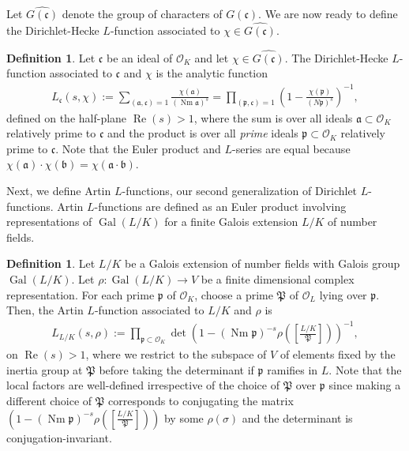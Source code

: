 \documentclass[12pt]{amsart}
\theoremstyle{definition}
\newtheorem{definition}[thm]{Definition}
\theoremstyle{remark}
\numberwithin{equation}{section}
\newcommand{\cO}{\mathcal O}
\newcommand{\fka}{\mathfrak a}
\newcommand{\fkb}{\mathfrak b}
\newcommand{\fkc}{\mathfrak c}
\newcommand{\fkp}{\mathfrak p}
\newcommand{\fkP}{\mathfrak{P}}
\DeclareMathOperator{\norm}{Nm}
\DeclareMathOperator{\re}{Re}
\newcommand{\inv}{^{-1}}
\newcommand{\artin}[2]{\left[ \frac{#1}{#2}\right]}
\DeclareMathOperator{\Gal}{Gal}
\begin{document}
Let $\widehat{G(\fkc)}$ denote the group of characters of $G(\fkc)$. We are now ready to define the Dirichlet-Hecke $L$-function associated to $\chi \in \widehat{G(\fkc)}$.

\begin{definition} \label{def:DirichletHeckeLFunction}
Let $\fkc$ be an ideal of $\cO_{K}$ and let $\chi \in \widehat{G(\fkc)}$. The Dirichlet-Hecke $L$-function associated to $\fkc$ and $\chi$ is the analytic function 
\begin{align}
L_{\fkc}(s,\chi) := \sum_{(\fka, \fkc) = 1}\frac{\chi(\fka)}{(\norm \fka)^{s}} = \prod_{(\fkp, \fkc) = 1}\left(1 - \frac{\chi(\fkp)}{(N\fkp)^s}\right)\inv,
\end{align}
defined on the half-plane $\re(s) > 1$, where the sum is over all ideals $\fka \subset \cO_{K}$ relatively prime to $\fkc$ and the product is over all \emph{prime} ideals $\fkp \subset \cO_{K}$ relatively prime to $\fkc$. Note that the Euler product and $L$-series are equal because $\chi(\fka) \cdot \chi(\fkb) = \chi(\fka \cdot \fkb)$.
\end{definition}

Next, we define Artin $L$-functions, our second generalization of Dirichlet $L$-functions. Artin $L$-functions are defined as an Euler product involving representations of $\Gal(L/K)$ for a finite Galois extension $L/K$ of number fields. 

\begin{definition}
Let $L/K$ be a Galois extension of number fields with Galois group $\Gal(L/K)$. Let $\rho: \Gal(L/K) \to V$ be a finite dimensional complex representation. For each prime $\fkp$ of $\cO_{K}$, choose a prime $\fkP$ of $\cO_{L}$ lying over $\fkp$. Then, the Artin $L$-function associated to $L/K$ and $\rho$ is
\begin{align}
L_{L/K}(s,\rho) := \prod_{\fkp \subset \cO_{K}} \det \left(1 - (\norm \fkp)^{-s} \rho\left(\artin{L/K}{\fkP}\right)\right)^{-1},
\end{align}
on $\re(s) > 1$, where we restrict to the subspace of $V$ of elements fixed by the inertia group at $\fkP$ before taking the determinant if $\fkp$ ramifies in $L$. Note that the local factors are well-defined irrespective of the choice of $\fkP$ over $\fkp$ since making a different choice of $\fkP$ corresponds to conjugating the matrix $\left(1 - (\norm \fkp)^{-s} \rho\left(\artin{L/K}{\fkP}\right)\right)$ by some $\rho(\sigma)$ and the determinant is conjugation-invariant.
\end{definition}
\end{document}
